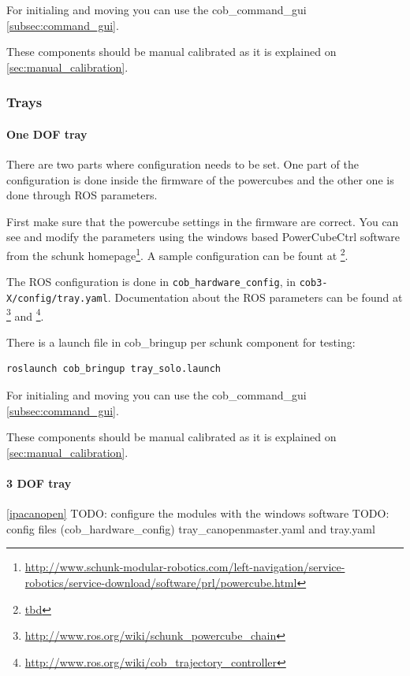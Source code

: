 For initialing and moving you can use the cob\_command\_gui \ref{subsec:command_gui}.

These components should be manual calibrated as it is explained on \ref{sec:manual_calibration}.

\subsubsection{Trays}
\paragraph{One DOF tray}

There are two parts where configuration needs to be set. One part of the configuration is done inside the firmware of the powercubes and the other one is done through ROS parameters.

First make sure that the powercube settings in the firmware are correct. You can see and modify the parameters using the windows based PowerCubeCtrl software from the schunk homepage\footnote{\url{http://www.schunk-modular-robotics.com/left-navigation/service-robotics/service-download/software/prl/powercube.html}}. A sample configuration can be fount at \footnote{\url{tbd}}.

The ROS configuration is done in \texttt{cob\_hardware\_config}, in \texttt{cob3-X/config/tray.yaml}. Documentation about the ROS parameters can be found at \footnote{\url{http://www.ros.org/wiki/schunk_powercube_chain}} and \footnote{\url{http://www.ros.org/wiki/cob_trajectory_controller}}.

There is a launch file in cob\_bringup per schunk component for testing:

\begin{lstlisting}
roslaunch cob_bringup tray_solo.launch
\end{lstlisting}

For initialing and moving you can use the cob\_command\_gui \ref{subsec:command_gui}.

These components should be manual calibrated as it is explained on \ref{sec:manual_calibration}.

\paragraph{3 DOF tray}
\ref{ipacanopen}
TODO: configure the modules with the windows software
TODO: config files (cob\_hardware\_config)  tray\_canopenmaster.yaml and tray.yaml


